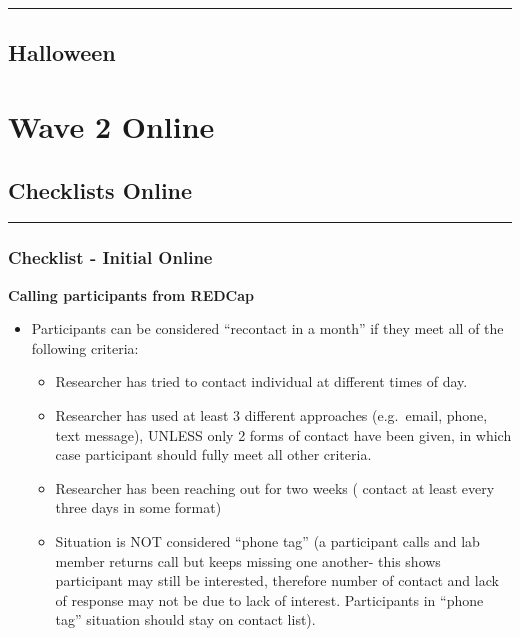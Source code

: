 \documentclass[]{book}
\providecommand{\tightlist}{%
  \setlength{\itemsep}{0pt}\setlength{\parskip}{0pt}}
\begin{document}
\begin{center}\rule{0.5\linewidth}{0.5pt}\end{center}

\hypertarget{halloween-1}{%
\section{Halloween}\label{halloween-1}}

\hypertarget{wave-2-online}{%
\chapter{Wave 2 Online}\label{wave-2-online}}

\hypertarget{checklists-online-1}{%
\section{Checklists Online}\label{checklists-online-1}}

\begin{center}\rule{0.5\linewidth}{0.5pt}\end{center}

\hypertarget{checklist---initial-online-1}{%
\subsection{Checklist - Initial Online}\label{checklist---initial-online-1}}

\textbf{Calling participants from REDCap}

\begin{itemize}
\tightlist
\item
  Participants can be considered ``recontact in a month'' if they meet all of the following criteria:

  \begin{itemize}
  \tightlist
  \item
    Researcher has tried to contact individual at different times of day.
  \item
    Researcher has used at least 3 different approaches (e.g.~email, phone, text message), UNLESS only 2 forms of contact have been given, in which case participant should fully meet all other criteria.
  \item
    Researcher has been reaching out for two weeks ( contact at least every three days in some format)\\
  \item
    Situation is NOT considered ``phone tag'' (a participant calls and lab member returns call but keeps missing one another- this shows participant may still be interested, therefore number of contact and lack of response may not be due to lack of interest. Participants in ``phone tag'' situation should stay on contact list).
  \end{itemize}
\end{itemize}
\end{document}
